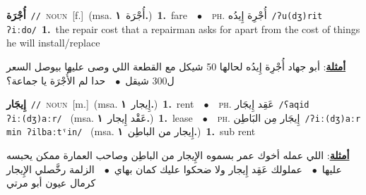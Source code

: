 \documentclass[10pt,a4paper,twoside]{article} %
\begin{document}
\begin{multicols}{2}
{\setlength\topsep{0pt}\textbf{\foreignlanguage{arabic}{أُجْرَة}}\ {\color{gray}\texttt{//}\color{black}}\ \textsc{noun}\ [f.]\ \color{gray}(msa. \foreignlanguage{arabic}{أُجْرَة}~\foreignlanguage{arabic}{\textbf{١.}})\color{black}\ \textbf{1.}~fare\ \ $\bullet$\ \ \textsc{ph.} \color{gray} \foreignlanguage{arabic}{أُجْرِة إِيدُه}\color{black}\ {\color{gray}\texttt{/{\sffamily ʔu(dʒ)rit ʔiːdo}/}\color{black}}\ \textbf{1.}~the repair cost that a repairman asks for apart from the cost of things he will install/replace\  \begin{flushright}\color{gray}\foreignlanguage{arabic}{\textbf{\underline{\foreignlanguage{arabic}{أمثلة}}}: أبو جهاد أُجْرِة إِيدُه لحالها 50 شيكل مع القطعة اللي وصى عليها بيوصل السعر ل300 شيقل\ $\bullet$\ \  حدا لم الأُجْرَة يا جماعة؟}\end{flushright}\color{black}} \vspace{2mm}

{\setlength\topsep{0pt}\textbf{\foreignlanguage{arabic}{إِيجَار}}\ {\color{gray}\texttt{//}\color{black}}\ \textsc{noun}\ [m.]\ \color{gray}(msa. \foreignlanguage{arabic}{إِيجار}~\foreignlanguage{arabic}{\textbf{١.}})\color{black}\ \textbf{1.}~rent\ \ $\bullet$\ \ \textsc{ph.} \color{gray} \foreignlanguage{arabic}{عَقِد إِيجَار}\color{black}\ {\color{gray}\texttt{/{\sffamily ʕaqid ʔiː(dʒ)aːr}/}\color{black}}\ \color{gray} (msa. \foreignlanguage{arabic}{عَقْد إِيجار}~\foreignlanguage{arabic}{\textbf{١.}})\color{black}\ \textbf{1.}~lease\ \ $\bullet$\ \ \textsc{ph.} \color{gray} \foreignlanguage{arabic}{إِيجَار مِن البَاطِن}\color{black}\ {\color{gray}\texttt{/{\sffamily ʔiː(dʒ)aːr min ʔilbaːtˤin}/}\color{black}}\ \color{gray} (msa. \foreignlanguage{arabic}{إِيجار من الباطِن}~\foreignlanguage{arabic}{\textbf{١.}})\color{black}\ \textbf{1.}~sub rent\  \begin{flushright}\color{gray}\foreignlanguage{arabic}{\textbf{\underline{\foreignlanguage{arabic}{أمثلة}}}: اللي عمله أخوك عمر بسموه الإِيجار من الباطِن وصاحب العمارة ممكن يحبسه عليها\ $\bullet$\ \  عملولك عَقِد إِيجار ولا ضحكوا عليك كمان بهاي\ $\bullet$\ \  الزلمة رخَّصلي الإِيجار كرمال عيون أبو مرتي}\end{flushright}\color{black}} \vspace{2mm}


\end{multicols}
\end{document}

